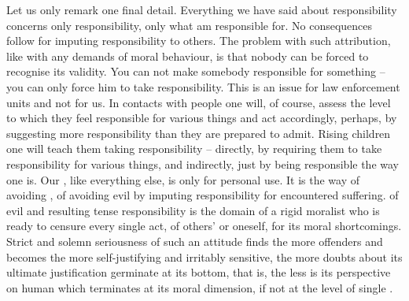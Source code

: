 Let us only remark one final detail. Everything we have said about
responsibility concerns only  responsibility, only what  am
responsible for. No consequences follow for imputing responsibility to others.
The problem with such attribution, like with any demands of moral behaviour, is
that nobody can be forced to recognise its validity. You can not make somebody
responsible for something -- you can only force him to take responsibility. This
is an issue for law enforcement units and not for us. In contacts with people
one will, of course, assess the level to which they feel responsible for various
things and act accordingly, perhaps, by suggesting more responsibility than they
are prepared to admit. Rising children one will teach them taking responsibility
-- directly, by requiring them to  take responsibility for various
things, and indirectly, just by being responsible the way one is. Our
, like everything else, is only for personal use.
It is the way of avoiding , of avoiding 
evil by imputing responsibility for encountered suffering. 
of evil and resulting tense responsibility is the domain of a rigid moralist who
is ready to censure every single act, of others' or oneself, for its moral
shortcomings.  Strict and solemn seriousness of such an attitude finds the more
offenders and becomes the more self-justifying and irritably sensitive, the more
doubts about its ultimate justification germinate at its bottom, that is, the
less  is its perspective on human
 which terminates at its moral dimension, if not at the level of
single .



